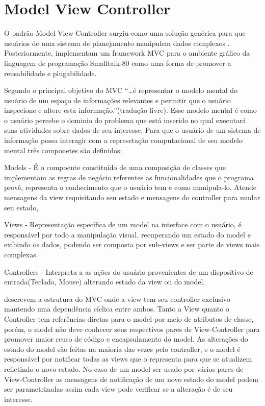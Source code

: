 \section{Model View Controller}

O padrão Model View Controller surgiu como uma solução genérica para que
usuários de uma sistema de planejamento manipulem dados complexos
. Posteriormente, 
implementam um framework MVC para o ambiente gráfico da linguagem de programação
Smalltalk-80 como uma forma de promover a reusabilidade e plugabilidade.

Segundo  o principal objetivo do MVC
``\ldots é representar o modelo mental do usuário de um espaço de informações
relevantes e permitir que o usuário inspecione e altere esta
informação.''(tradução livre).
Esse modelo mental é como o usuário percebe o dominio do problema que está inserido no qual executará suas atividades sobre dados de seu interesse. Para que o usuário de um sistema de
informação possa interagir com a represetação computacional  de seu modelo
mental três componetes são definidos:

Models - É o compoente constituído de uma composição de classes que implementam
as regras de negócio referentes as funcionalidades que o programa provê,
representa o  conhecimento que o usuário tem e como manipula-lo. Atende
mensagens da view requisitando seu estado e mensagens do controller para mudar
seu estado,

Views - Representação específica de um model na interface com o usuário, é 
responsável por todo a manipulação visual, recuperando um estado do model e
exibindo os dados, podendo ser composta por sub-views e ser parte de views mais
complexas.

Controllers - Interpreta a as ações do usuário provenientes de um dispositivo de
entrada(Teclado, Mouse) alterando estado da view ou do model.




 descrevem a estrutura do MVC onde a view tem seu
controller exclusivo mantendo uma dependência cíclica entre ambos. Tanto a View
quanto o Controller tem referências diretas para o model por meio de atributos
de classe, porém, o model não deve conhecer seus respectivos pares de
View-Controller para promover maior reuso de código e encapsulamento do model.
As alterações do estado do model são feitas na maioria das vezes pelo controller, e
o model é responsável por notificar todas as views que o representa para que
se atualizem refletindo o novo estado. No caso de um model ser usado por vários
pares de View-Controller as mensagens de notificação de um novo estado do model
podem ser parametrizadas assim cada view pode verificar se a alteração é de seu
interesse. 

